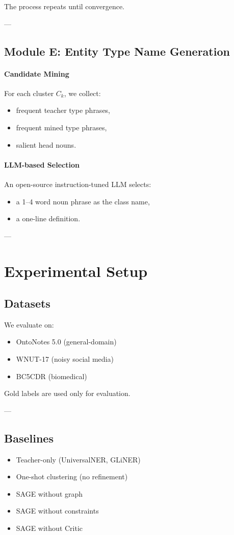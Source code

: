 \documentclass[14pt]{extreport}
\begin{document}
The process repeats until convergence.

---

\subsection{Module E: Entity Type Name Generation}

\paragraph{Candidate Mining}
For each cluster $C_k$, we collect:
\begin{itemize}
    \item frequent teacher type phrases,
    \item frequent mined type phrases,
    \item salient head nouns.
\end{itemize}

\paragraph{LLM-based Selection}
An open-source instruction-tuned LLM selects:
\begin{itemize}
    \item a 1--4 word noun phrase as the class name,
    \item a one-line definition.
\end{itemize}

---

\section{Experimental Setup}

\subsection{Datasets}
We evaluate on:
\begin{itemize}
    \item OntoNotes 5.0 (general-domain)
    \item WNUT-17 (noisy social media)
    \item BC5CDR (biomedical)
\end{itemize}

Gold labels are used only for evaluation.

---

\subsection{Baselines}
\begin{itemize}
    \item Teacher-only (UniversalNER, GLiNER)
    \item One-shot clustering (no refinement)
    \item SAGE without graph
    \item SAGE without constraints
    \item SAGE without Critic
\end{itemize}
\end{document}
